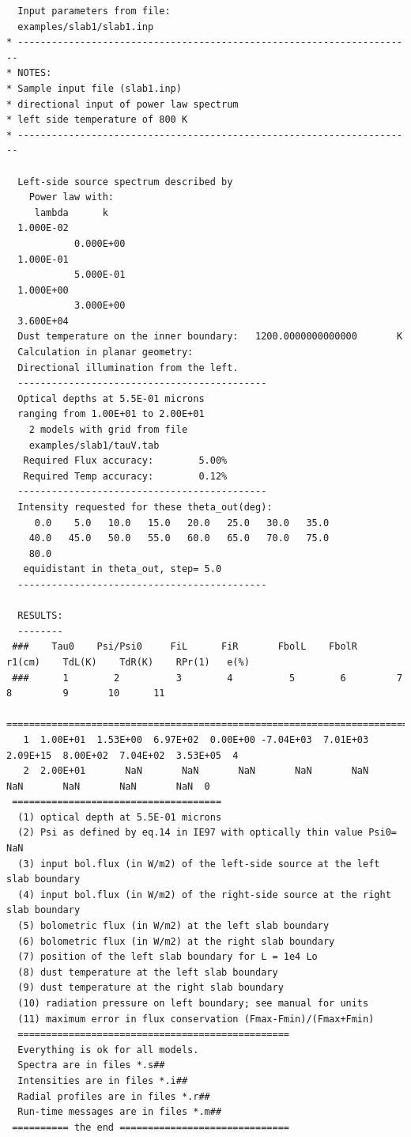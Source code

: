 \documentclass[11pt]{article}
\begin{document}
\begin{appendix}
\begin{verbatim}
  Input parameters from file:
  examples/slab1/slab1.inp
* ----------------------------------------------------------------------
* NOTES:
* Sample input file (slab1.inp)
* directional input of power law spectrum
* left side temperature of 800 K
* ----------------------------------------------------------------------

  Left-side source spectrum described by
    Power law with:
     lambda      k
  1.000E-02
            0.000E+00
  1.000E-01
            5.000E-01
  1.000E+00
            3.000E+00
  3.600E+04
  Dust temperature on the inner boundary:   1200.0000000000000       K
  Calculation in planar geometry:
  Directional illumination from the left.
  --------------------------------------------
  Optical depths at 5.5E-01 microns
  ranging from 1.00E+01 to 2.00E+01
    2 models with grid from file
    examples/slab1/tauV.tab
   Required Flux accuracy:        5.00%
   Required Temp accuracy:        0.12%
  --------------------------------------------
  Intensity requested for these theta_out(deg):
     0.0    5.0   10.0   15.0   20.0   25.0   30.0   35.0
    40.0   45.0   50.0   55.0   60.0   65.0   70.0   75.0
    80.0
   equidistant in theta_out, step= 5.0
  --------------------------------------------

  RESULTS:
  --------
 ###    Tau0    Psi/Psi0     FiL      FiR       FbolL    FbolR     r1(cm)    TdL(K)    TdR(K)    RPr(1)   e(%)
 ###      1        2          3        4          5        6         7          8         9       10      11
 =============================================================================================================
   1  1.00E+01  1.53E+00  6.97E+02  0.00E+00 -7.04E+03  7.01E+03  2.09E+15  8.00E+02  7.04E+02  3.53E+05  4
   2  2.00E+01       NaN       NaN       NaN       NaN       NaN       NaN       NaN       NaN       NaN  0
 =====================================
  (1) optical depth at 5.5E-01 microns
  (2) Psi as defined by eq.14 in IE97 with optically thin value Psi0=      NaN
  (3) input bol.flux (in W/m2) of the left-side source at the left slab boundary
  (4) input bol.flux (in W/m2) of the right-side source at the right slab boundary
  (5) bolometric flux (in W/m2) at the left slab boundary
  (6) bolometric flux (in W/m2) at the right slab boundary
  (7) position of the left slab boundary for L = 1e4 Lo
  (8) dust temperature at the left slab boundary
  (9) dust temperature at the right slab boundary
  (10) radiation pressure on left boundary; see manual for units
  (11) maximum error in flux conservation (Fmax-Fmin)/(Fmax+Fmin)
  ================================================
  Everything is ok for all models.
  Spectra are in files *.s##
  Intensities are in files *.i##
  Radial profiles are in files *.r##
  Run-time messages are in files *.m##
 ========== the end ==============================


\end{verbatim}
\end{appendix}
\end{document}

